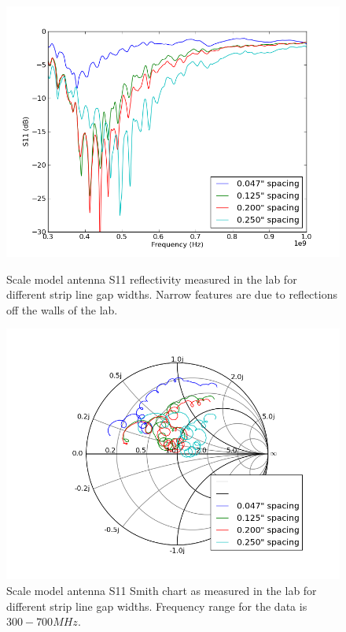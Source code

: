 \begin{figure}[htb]
\centering
\begin{minipage}[b]{0.50\textwidth}
\centering
\includegraphics[width=0.95\linewidth]{SCIHI_system/figures/HIbiscus_S11_model_spacing_dB.png}
\caption{Scale model antenna S11 reflectivity measured in the lab for different strip line gap widths. Narrow features are due to reflections off the walls of the lab.}
\label{Fig:HIS11_model_inc_dB}
\end{minipage}%
\begin{minipage}[b]{0.02\textwidth}
\hspace{1cm}
\end{minipage}%
\begin{minipage}[b]{0.46\textwidth}
\centering
\includegraphics[width=0.95\linewidth]{SCIHI_system/figures/HIbiscus_S11_model_spacing_Smith.png}
\caption{Scale model antenna S11 Smith chart as measured in the lab for different strip line gap widths. Frequency range for the data is $300-700 MHz$. }
\label{Fig:HIS11_model_inc_Smith}
\end{minipage}
\end{figure}

